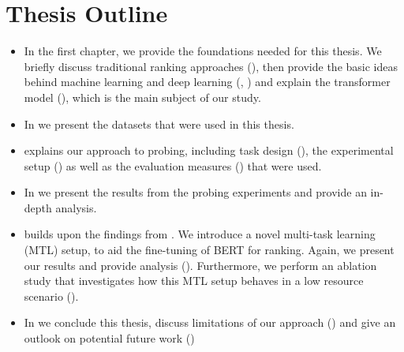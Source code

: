 \section{Thesis Outline}
\begin{itemize}
    \item In the first chapter, we provide the foundations needed for this thesis. We briefly discuss traditional ranking approaches (), then provide the basic ideas behind machine learning and deep learning (, ) and explain the transformer model (), which is the main subject of our study.
    \item In  we present the datasets that were used in this thesis.
    \item {} explains our approach to probing, including task design (), the experimental setup () as well as the evaluation measures () that were used.
    \item In  we present the results from the probing experiments and provide an in-depth analysis.
    \item {} builds upon the findings from . We introduce a novel multi-task learning (MTL) setup, to aid the fine-tuning of BERT for ranking. Again, we present our results and provide analysis (). Furthermore, we perform an ablation study that investigates how this MTL setup behaves in a low resource scenario ().
    \item In  we conclude this thesis, discuss limitations of our approach () and give an outlook on potential future work ()
\end{itemize}
